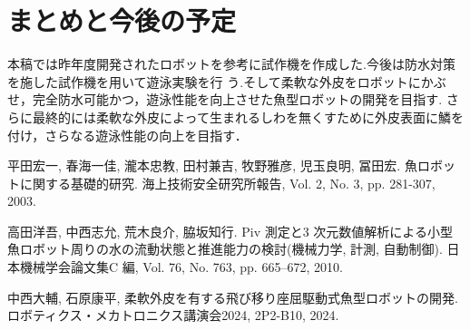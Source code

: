 \documentclass{jarticle}
\begin{document}

\section{まとめと今後の予定}

本稿では昨年度開発されたロボットを参考に試作機を作成した.今後は防水対策を施した試作機を用いて遊泳実験を行
う.そして柔軟な外皮をロボットにかぶせ，完全防水可能かつ，遊泳性能を向上させた魚型ロボットの開発を目指す.
さらに最終的には柔軟な外皮によって生まれるしわを無くすために外皮表面に鱗を付け，さらなる遊泳性能の向上を目指す．



% 
% 


\begin{thebibliography}{99}

   平田宏一, 春海一佳, 瀧本忠教, 田村兼吉, 牧野雅彦, 児玉良明, 冨田宏. 魚ロボットに関する基礎的研究. 海上技術安全研究所報告, Vol. 2, No. 3, pp. 281-307, 2003.

   高田洋吾, 中西志允, 荒木良介, 脇坂知行. Piv 測定と3 次元数値解析による小型魚ロボット周りの水の流動状態と推進能力の検討(機械力学, 計測, 自動制御). 日本機械学会論文集C 編, Vol. 76, No. 763, pp. 665–672, 2010.

   中西大輔, 石原康平, 柔軟外皮を有する飛び移り座屈駆動式魚型ロボットの開発. ロボティクス・メカトロニクス講演会2024, 2P2-B10, 2024.

\end{thebibliography}
\end{document}

